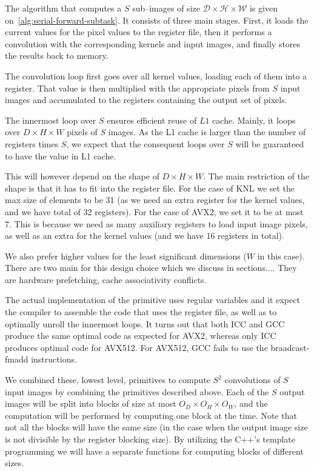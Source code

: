   The algorithm that computes a $S$ sub--images of size $\mathcal{D}
  \times \mathcal{H} \times \mathcal{W}$ is given
  on~\ref{alg:serial-forward-subtask}.  It consists of three main
  stages.  First, it loads the current values for the pixel values to
  the register file, then it performs a convolution with the
  corresponding kernels and input images, and finally stores the
  results back to memory.

  The convolution loop first goes over all kernel values, loading each
  of them into a register.  That value is then multiplied with the
  appropriate pixels from $S$ input images and accumulated to the
  registers containing the output set of pixels.

  The innermost loop over $S$ ensures efficient reuse of $L1$ cache.
  Mainly, it loops over $D \times H \times W$ pixels of $S$ images.
  As the L1 cache is larger than the number of registers times $S$, we
  expect that the consequent loops over $S$ will be guaranteed to have
  the value in L1 cache.

  This will however depend on the shape of $D \times H \times W$.  The
  main restriction of the shape is that it has to fit into the
  register file.  For the case of KNL we set the max size of elements
  to be 31 (as we need an extra register for the kernel values, and we
  have total of 32 registers).  For the case of AVX2, we set it to be
  at most 7.  This is because we need as many auxiliary registers to
  load input image pixels, as well as an extra for the kernel values
  (and we have 16 registers in total).

  We also prefer higher values for the least significant dimensions
  ($W$ in this case).  There are two main for this design choice
  which we discuss in sections.... They are hardware prefetching,
  cache associativity conflicts.

  The actual implementation of the primitive uses regular variables
  and it expect the compiler to assemble the code that uses the
  register file, as well as to optimally unroll the innermost loops.
  It turns out that both ICC and GCC produce the same optimal code as
  expected for AVX2, whereas only ICC produces optimal code for
  AVX512.  For AVX512, GCC fails to use the braadcast-fmadd
  instructions.

  We combined these, lowest level, primitives to compute $S^2$
  convolutions of $S$ input images by combining the primitives
  described above.  Each of the $S$ output images will be split into
  blocks of size at most $O_D \times O_H \times O_W$, and the
  computation will be performed by computing one block at the time.
  Note that not all the blocks will have the same size (in the case
  when the output image size is not divisible by the register blocking
  size).  By utilizing the C++'s template programming we will have a
  separate functions for computing blocks of different sizes.

